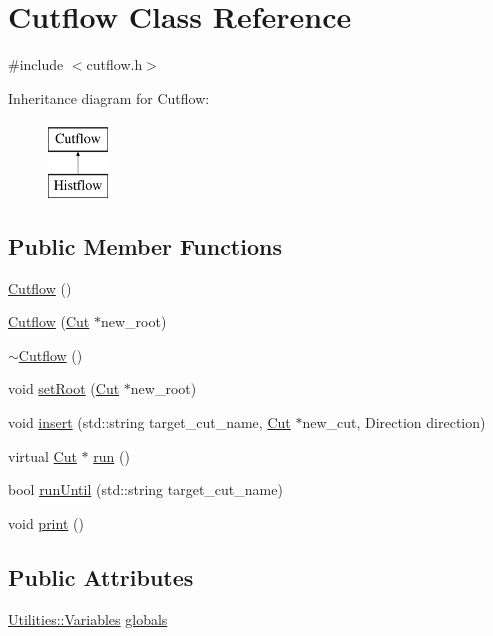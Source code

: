 \hypertarget{classCutflow}{}\section{Cutflow Class Reference}
\label{classCutflow}


{\ttfamily \#include $<$cutflow.\+h$>$}

Inheritance diagram for Cutflow\+:\begin{figure}[H]
\begin{center}
\leavevmode
\includegraphics[height=2.000000cm]{classCutflow}
\end{center}
\end{figure}
\subsection*{Public Member Functions}
\begin{DoxyCompactItemize}
\item 
\hyperlink{classCutflow_a17811cb40a7906fc65e79ce69e3b21be}{Cutflow} ()
\item 
\hyperlink{classCutflow_a943ac94db62104f63499c41b5aa83b4d}{Cutflow} (\hyperlink{classCut}{Cut} $\ast$new\+\_\+root)
\item 
\hyperlink{classCutflow_adb300cd78d57a287934e4d22856a0ffe}{$\sim$\+Cutflow} ()
\item 
void \hyperlink{classCutflow_ad27d37141c3748779a5d81fad919ecbb}{set\+Root} (\hyperlink{classCut}{Cut} $\ast$new\+\_\+root)
\item 
void \hyperlink{classCutflow_a8da46f1053a6b97991489ee0920c29a1}{insert} (std\+::string target\+\_\+cut\+\_\+name, \hyperlink{classCut}{Cut} $\ast$new\+\_\+cut, Direction direction)
\item 
virtual \hyperlink{classCut}{Cut} $\ast$ \hyperlink{classCutflow_a563da4fc41aa5c611dd0ce37ce966f2c}{run} ()
\item 
bool \hyperlink{classCutflow_a3b5a6dc6e9490037d190eca691295859}{run\+Until} (std\+::string target\+\_\+cut\+\_\+name)
\item 
void \hyperlink{classCutflow_a0cb4c8bd6d15ace1f85fe0cfb8d9d828}{print} ()
\end{DoxyCompactItemize}
\subsection*{Public Attributes}
\begin{DoxyCompactItemize}
\item 
\hyperlink{classUtilities_1_1Variables}{Utilities\+::\+Variables} \hyperlink{classCutflow_a71390324488ac6ed4a72c41f4a2c1c10}{globals}
\end{DoxyCompactItemize}
